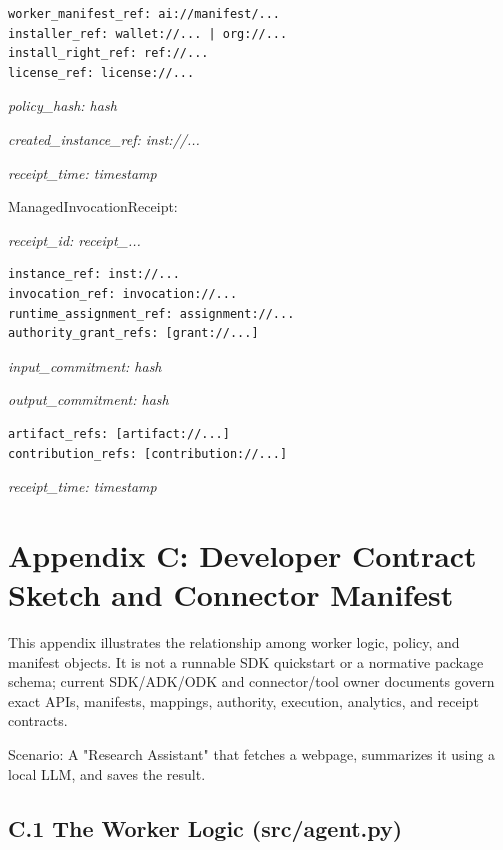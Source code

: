 \documentclass[
  11pt,
]{article}
\begin{document}
\begin{lstlisting}[language=rustioi]
worker_manifest_ref: ai://manifest/...
installer_ref: wallet://... | org://...
install_right_ref: ref://...
license_ref: license://...
\end{lstlisting}
\emph{policy\_hash: hash}

\emph{created\_instance\_ref: inst://...}

\emph{receipt\_time: timestamp}

ManagedInvocationReceipt:

\emph{receipt\_id: receipt\_...}

\begin{lstlisting}[language=rustioi]
instance_ref: inst://...
invocation_ref: invocation://...
runtime_assignment_ref: assignment://...
authority_grant_refs: [grant://...]
\end{lstlisting}
\emph{input\_commitment: hash}

\emph{output\_commitment: hash}

\begin{lstlisting}[language={},basicstyle=\ttfamily\scriptsize]
artifact_refs: [artifact://...]
contribution_refs: [contribution://...]
\end{lstlisting}
\emph{receipt\_time: timestamp}

\hypertarget{appendix-c-developer-quickstart-and-connector-manifest}{%
\section{\texorpdfstring{\textbf{Appendix C: Developer Contract Sketch and
Connector
Manifest}}{Appendix C: Developer Contract Sketch and Connector Manifest}}\label{appendix-c-developer-quickstart-and-connector-manifest}}

This appendix illustrates the relationship among worker logic, policy, and
manifest objects. It is not a runnable SDK quickstart or a normative package
schema; current SDK/ADK/ODK and connector/tool owner documents govern exact
APIs, manifests, mappings, authority, execution, analytics, and receipt
contracts.

Scenario: A "Research Assistant" that fetches a webpage, summarizes it
using a local LLM, and saves the result.

\hypertarget{c.1-the-worker-logic-srcagent.py}{%
\subsection{\texorpdfstring{\textbf{C.1 The Worker Logic
(src/agent.py)}}{C.1 The Worker Logic (src/agent.py)}}\label{c.1-the-worker-logic-srcagent.py}}
\end{document}
